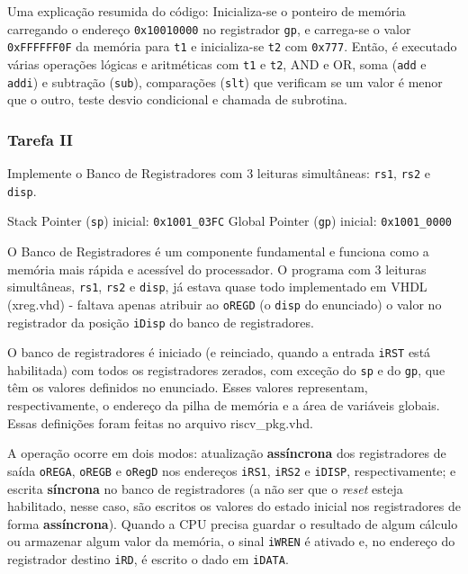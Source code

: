 \documentclass[a4paper,12pt]{article}
\newcommand{\cod}[1]{\texttt{#1}}
\begin{document}
Uma explicação resumida do código: Inicializa-se o ponteiro de memória carregando o endereço \cod{0x10010000} no registrador \cod{gp}, e carrega-se o valor \cod{0xFFFFFF0F} da memória para \cod{t1} e inicializa-se \cod{t2} com \cod{0x777}. Então, é executado várias operações lógicas e aritméticas com \cod{t1} e \cod{t2}, AND e OR, soma (\cod{add} e \cod{addi}) e subtração (\cod{sub}), comparações (\cod{slt}) que verificam se um valor é menor que o outro, teste desvio condicional e chamada de subrotina.


\subsubsection{Tarefa II}
\begin{tcolorbox}[title=Enunciado, colback=blue!5!white, colframe=blue!75!black]
Implemente o Banco de Registradores com 3 leituras simultâneas: \cod{rs1}, \cod{rs2} e \cod{disp}.

\centering \footnotesize Stack Pointer (\cod{sp}) inicial: \cod{0x1001\_03FC} \hspace{1cm} Global Pointer (\cod{gp}) inicial: \cod{0x1001\_0000}
\end{tcolorbox}
O Banco de Registradores é um componente fundamental e funciona como a memória mais rápida e acessível do processador. O programa com 3 leituras simultâneas, \cod{rs1}, \cod{rs2} e \cod{disp}, já estava quase todo implementado em VHDL (xreg.vhd) - faltava apenas atribuir ao \cod{oREGD} (o \cod{disp} do enunciado) o valor no registrador da posição \cod{iDisp} do banco de registradores.

O banco de registradores é iniciado (e reinciado, quando a entrada \cod{iRST} está habilitada) com todos os registradores zerados, com exceção do \cod{sp} e do \cod{gp}, que têm os valores definidos no enunciado. Esses valores representam, respectivamente, o endereço da pilha de memória e a área de variáveis globais. Essas definições foram feitas no arquivo riscv\_pkg.vhd.

A operação ocorre em dois modos: atualização \textbf{assíncrona} dos registradores de saída \cod{oREGA}, \cod{oREGB} e \cod{oRegD} nos endereços \cod{iRS1}, \cod{iRS2} e \cod{iDISP}, respectivamente; e escrita \textbf{síncrona} no banco de registradores (a não ser que o \textit{reset} esteja habilitado, nesse caso, são escritos os valores do estado inicial nos registradores de forma \textbf{assíncrona}). Quando a CPU precisa guardar o resultado de algum cálculo ou armazenar algum valor da memória, o sinal \cod{iWREN} é ativado e, no endereço do registrador destino \cod{iRD}, é escrito o dado em \cod{iDATA}.
\end{document}
